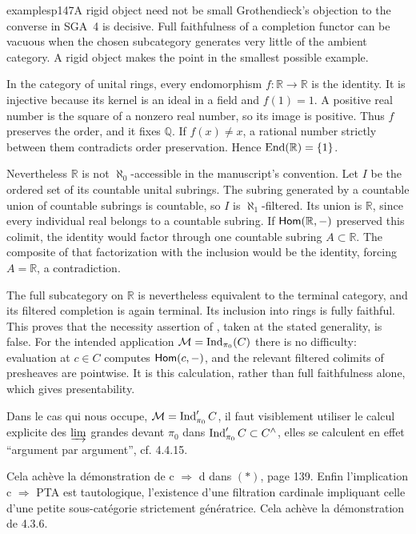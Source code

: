 \begin{dcomment}{examples}{p147}{A rigid object need not be small}
Grothendieck's objection to the converse in SGA~4 is decisive. Full faithfulness of a completion functor can be vacuous when the chosen subcategory generates very little of the ambient category. A rigid object makes the point in the smallest possible example.

In the category of unital rings, every endomorphism $f:\mathbb R\to\mathbb R$ is the identity. It is injective because its kernel is an ideal in a field and $f(1)=1$. A positive real number is the square of a nonzero real number, so its image is positive. Thus $f$ preserves the order, and it fixes $\mathbb Q$. If $f(x)\neq x$, a rational number strictly between them contradicts order preservation. Hence $\operatorname{End}(\mathbb R)=\{1\}$.

Nevertheless $\mathbb R$ is not $\aleph_0$-accessible in the manuscript's convention. Let $I$ be the ordered set of its countable unital subrings. The subring generated by a countable union of countable subrings is countable, so $I$ is $\aleph_1$-filtered. Its union is $\mathbb R$, since every individual real belongs to a countable subring. If $\mathsf{Hom}(\mathbb R,-)$ preserved this colimit, the identity would factor through one countable subring $A\subset\mathbb R$. The composite of that factorization with the inclusion would be the identity, forcing $A=\mathbb R$, a contradiction.

The full subcategory on $\mathbb R$ is nevertheless equivalent to the terminal category, and its filtered completion is again terminal. Its inclusion into rings is fully faithful. This proves that the necessity assertion of \citet[Expos\'e~I, Corollary~9.18(a)]{SGA4I1972}, taken at the stated generality, is false. For the intended application $\mathcal M=\operatorname{Ind}_{\pi_0}(C)$ there is no difficulty: evaluation at $c\in C$ computes $\mathsf{Hom}(c,-)$, and the relevant filtered colimits of presheaves are pointwise. It is this calculation, rather than full faithfulness alone, which gives presentability.
\end{dcomment}


Dans le cas qui nous occupe, $\mathcal{M}=\operatorname{Ind}'_{\pi_0}C$, il faut visiblement utiliser le calcul explicite des $\varinjlim$ grandes devant $\pi_0$ dans $\operatorname{Ind}'_{\pi_0}C\subset C^{\wedge}$, elles se calculent en effet “argument par argument”, cf. 4.4.15.

Cela achève la démonstration de c $\Longrightarrow$ d dans $(*)$, page 139. Enfin l'implication c $\Longrightarrow$ PTA est tautologique, l'existence d'une filtration cardinale impliquant celle d'une petite sous-catégorie strictement génératrice. Cela achève la démonstration de 4.3.6.

